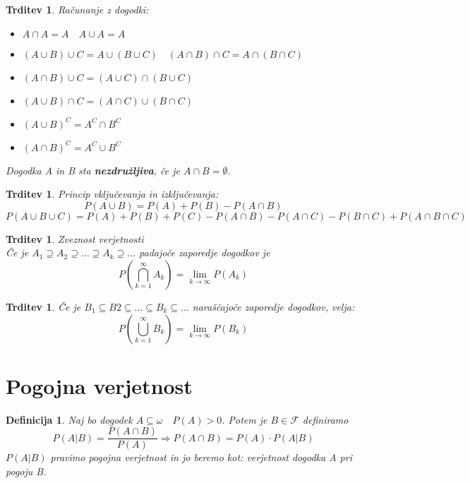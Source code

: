 \documentclass[11pt]{article}
\newtheorem{Trditev}[Izrek]{{\sc Trditev}}
\newtheorem{Definicija}[Izrek]{{\sc Definicija}}
\begin{document}
	\begin{Trditev}
		Računanje z dogodki:
		\begin{itemize}
			\item
			$A\cap A = A \quad A\cup A = A$
			\item
			$(A\cup B)\cup C = A\cup (B \cup C) \quad (A\cap B) \cap C = A \cap (B\cap C)$
			\item
			$(A\cap B)\cup C = (A \cup C ) \cap (B\cup C)$ 
			\item
			$(A\cup B)\cap C = (A \cap C ) \cup (B\cap C)$ 
			\item
			$(A \cup B)^C = A^C \cap B^C$
			\item
			$(A\cap B) ^C = A^C \cup B^C$
		\end{itemize}
		
		Dogodka A in B sta \textbf{nezdružljiva}, če je $A \cap B = \emptyset$.
	\end{Trditev}
	
	
	\begin{Trditev}
		Princip vključevanja in izključevanja:
		$$P(A\cup B  ) = P(A) + P(B) - P(A \cap B)$$
		$$P(A \cup B \cup C) = P(A) + P(B) + P(C) - P(A \cap B) - P(A \cap C ) - P(B \cap C) + P(A\cap B \cap C)$$
	\end{Trditev}
	
	\begin{Trditev}
		Zveznost verjetnosti
		\\
		Če je $A_1 \supseteq A_2 \supseteq \dots \supseteq A_k \supseteq \dots $ padajoče zaporedje dogodkov je 
		\[
		P(\bigcap_{k=1}^{\infty} A_k) = \lim\limits_{k \to \infty}{P(A_k)}
		\]
	\end{Trditev}
	\begin{Trditev}
		Če je $ B_1 \subseteq B2 \subseteq ... \subseteq B_k \subseteq \dots$ naraščajoče zaporedje dogodkov, velja:
		\[
		P(\bigcup_{k=1}^{\infty} B_k) = \lim\limits_{k \to \infty}{P(B_k)}
		\]
	\end{Trditev}
	\section{Pogojna verjetnost}
	\begin{Definicija}
		Naj bo dogodek $A \subseteq \omega \quad P(A) > 0$.
		Potem je $B\in \mathcal{F}$ definiramo $$P(A|B) = \frac{P(A \cap B)}{P(A)} \Rightarrow P(A\cap B) = P(A) \cdot P(A|B)$$
		$P(A|B)$ pravimo pogojna verjetnost in jo beremo kot: verjetnost dogodka A pri pogoju B.
	\end{Definicija}
	
\end{document}
